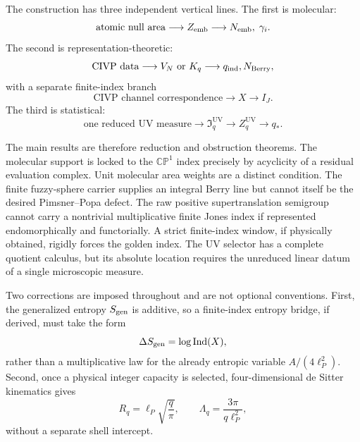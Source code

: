 \documentclass[aps,prd,preprint,nofootinbib,superscriptaddress]{revtex4-2}
\theoremstyle{definition}
\theoremstyle{remark}
\newcommand{\Ind}{\operatorname{Ind}}
\newcommand{\UV}{\mathrm{UV}}
\newcommand{\cI}{\mathfrak I}
\newcommand{\CP}{\mathbb{CP}}
\begin{document}
The construction has three independent vertical lines.  The first is molecular:
\begin{equation}
\text{atomic null area}
\longrightarrow
Z_{\rm emb}
\longrightarrow
N_{\rm emb},\;\gamma_i.
\label{eq:intro-molecular}
\end{equation}
The second is representation-theoretic:
\begin{equation}
\text{CIVP data}
\longrightarrow
V_N\ {\rm or}\ K_q
\longrightarrow
q_{\rm ind},N_{\rm Berry},
\label{eq:intro-carrier}
\end{equation}
with a separate finite-index branch
\begin{equation}
\text{CIVP channel correspondence}
\longrightarrow
X
\longrightarrow
I_J.
\label{eq:intro-index}
\end{equation}
The third is statistical:
\begin{equation}
\text{one reduced UV measure}
\longrightarrow
\cI_q^{\UV}
\longrightarrow
Z_q^{\UV}
\longrightarrow
q_*.
\label{eq:intro-selector}
\end{equation}

The main results are therefore reduction and obstruction theorems.  The molecular support is locked to the $\CP^1$ index precisely by acyclicity of a residual evaluation complex.  Unit molecular area weights are a distinct condition.  The finite fuzzy-sphere carrier supplies an integral Berry line but cannot itself be the desired Pimsner--Popa defect.  The raw positive supertranslation semigroup cannot carry a nontrivial multiplicative finite Jones index if represented endomorphically and functorially.  A strict finite-index window, if physically obtained, rigidly forces the golden index.  The UV selector has a complete quotient calculus, but its absolute location requires the unreduced linear datum of a single microscopic measure.

Two corrections are imposed throughout and are not optional conventions.  First, the generalized entropy $S_{\rm gen}$ is additive, so a finite-index entropy bridge, if derived, must take the form
\begin{equation}
\Delta S_{\rm gen}=\log\Ind(X),
\label{eq:intro-entropy}
\end{equation}
rather than a multiplicative law for the already entropic variable $A/(4\ell_P^2)$.  Second, once a physical integer capacity is selected, four-dimensional de Sitter kinematics gives
\begin{equation}
R_q=\ell_P\sqrt{\frac q\pi},
\qquad
\Lambda_q=\frac{3\pi}{q\ell_P^2},
\label{eq:intro-ds}
\end{equation}
without a separate shell intercept.
\end{document}
